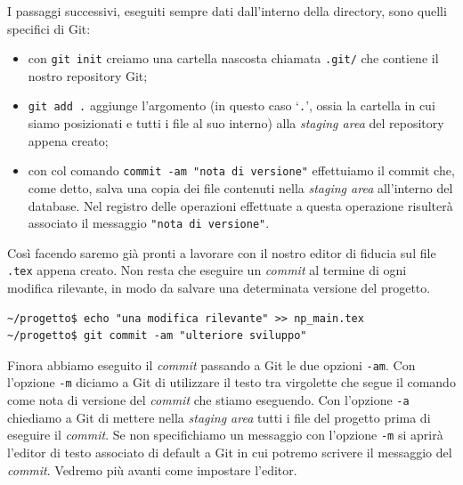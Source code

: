 \documentclass[a4paper,12pt,oneside]{article}
\begin{document}
I passaggi successivi, eseguiti sempre dati dall'interno della directory, sono
quelli specifici di Git:
\begin{itemize}
\item con \lstinline|git init| creiamo una cartella nascosta chiamata
  \lstinline|.git/| che contiene il nostro repository Git;
\item \lstinline|git add .| aggiunge l'argomento (in questo caso `\lstinline|.|',
  ossia la cartella in cui siamo posizionati e tutti i file al suo interno) alla
  \emph{staging area} del repository appena creato;
\item con col comando \lstinline|commit -am "nota di versione"| effettuiamo il
  commit che, come detto, salva una copia dei file contenuti nella \emph{staging
    area} all'interno del database. Nel registro delle operazioni effettuate a
  questa operazione risulterà associato il messaggio \lstinline|"nota di versione"|.
\end{itemize}

Così facendo saremo già pronti a lavorare con il nostro editor di fiducia sul
file \lstinline|.tex| appena creato.
Non resta che eseguire un \emph{commit} al termine di ogni modifica rilevante,
in modo da salvare una determinata versione del progetto.
\begin{lstlisting}
~/progetto$ echo "una modifica rilevante" >> np_main.tex
~/progetto$ git commit -am "ulteriore sviluppo"
\end{lstlisting}

Finora abbiamo eseguito il \emph{commit} passando a Git le due opzioni
\lstinline|-am|. Con l'opzione \lstinline|-m| diciamo a Git di utilizzare il
testo tra virgolette che segue il comando come nota di versione del \emph{commit}
che stiamo eseguendo. Con l'opzione \lstinline|-a| chiediamo a Git di mettere
nella \emph{staging area} tutti i file del progetto prima di eseguire il
\emph{commit}. Se non specifichiamo un messaggio con l'opzione \lstinline|-m| si
aprirà l'editor di testo associato di default a Git in cui potremo scrivere il
messaggio del \emph{commit}. Vedremo più avanti come impostare l'editor.
\end{document}
